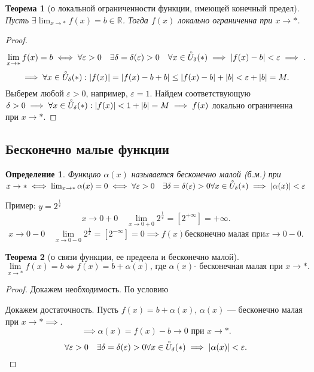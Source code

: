 \documentclass[a4paper,12pt]{article} %
\newtheorem{definition}{Определение}[subsection]
\newtheorem{theorem}{Теорема}[subsection]
\theoremstyle{remark}
\begin{document}
\begin{theorem}[о локальной ограниченности функции, имеющей конечный предел]
	Пусть $\exists \lim_{x \to *} f(x) = b \in \mathbb{R}$. Тогда $f(x)$ локально ограниченна при $x\to *$.
\end{theorem}
\begin{proof}
	\[
	\lim_{x \to *} f(x)=b \iff \forall \varepsilon> 0 \quad \exists \delta=\delta(\varepsilon)>0 \quad \forall x\in \accentset{\circ}{U}_\delta(*) \implies |f(x) - b| < \varepsilon \implies
	.\] 
	\[
	\implies \forall x\in \accentset{\circ}{U}_\delta(*) : |f(x)| = |f(x) -b + b| \le  |f(x) -b| + |b| < \varepsilon + |b| = M
	.\] 
	Выберем любой $\varepsilon>0$, например, $\varepsilon=1$. Найдем соответствующую $\delta>0 \implies \forall x\in \accentset{\circ}{U}_\delta(*) : |f(x)| < 1 + |b| = M \implies f(x) $ локально ограниченна при $x \to *$.
\end{proof}

\subsection{Бесконечно малые функции}
\begin{definition}
	Функцию $\alpha(x)$ называется бесконечно малой (б.м.) при $x \to  *\iff \lim_{x \to *} \alpha(x) = 0 \iff \forall  \varepsilon>0 \quad \exists \delta=\delta(\varepsilon) > 0 \forall x \in  \accentset{\circ}{U}_\delta(*) \implies |\alpha(x)| < \varepsilon $
\end{definition}
Пример: $y = 2^{\frac{1}{x}}$
\[
	x\to 0+0 \quad \lim_{x \to 0+0} 2^{\frac{1}{x}} = [2^{+\infty}] = +\infty
.\]
\[
	x\to 0-0 \quad \lim_{x \to 0-0} 2^{\frac{1}{x}} = [2^{-\infty}] = 0 \implies f(x) \text{бесконечно малая при} x \to 0-0
.\]

\begin{theorem}[о связи функции, ее предеела и бесконечно малой]
\[
\lim_{x \to *} f(x) = b \iff f(x) = b + \alpha(x) \text{, где }\alpha(x) \text{- бесконечная малая при }x\to *
.\] 	
\end{theorem}
\begin{proof}
	Докажем необходимость.
	По условию 

	Докажем достаточность. Пусть $f(x) = b + \alpha(x)$,  $\alpha(x)$ --- бесконечно малая при  $x \to  * \implies$.
	\[
		\implies \alpha(x) = f(x) - b \to  0 \text{ при } x\to *
	.\] 
	\[\forall  \varepsilon>0 \quad \exists \delta=\delta(\varepsilon) > 0 \forall x \in  \accentset{\circ}{U}_\delta(*) \implies |\alpha(x)| < \varepsilon 
	.\]
\end{proof}
\end{document}
